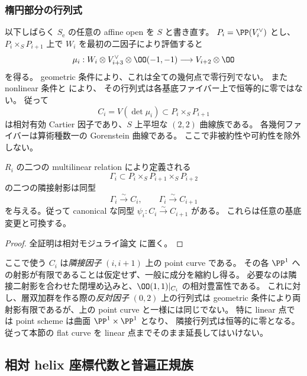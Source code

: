 \subsubsection{楕円部分の行列式}

以下しばらく $S_{\mathrm e}$ の任意の affine open を $S$ と書き直す。
$P_i=\PP(V_i^{\vee})$ とし、$P_i\times_S P_{i+1}$ 上で $W_i$ を最初の二因子により評価すると
\begin{equation}\label{noeth-eq:relation-matrix}
 \mu_i:W_i\otimes V_{i+3}^{\vee}\otimes\OO(-1,-1)
 \longrightarrow V_{i+2}\otimes\OO
\end{equation}
を得る。
geometric 条件により、これは全ての幾何点で零行列でない。
また nonlinear 条件と \cite[\S5.4, 特に Lemma 5.4.10]{VdB2011} により、
その行列式は各基底ファイバー上で恒等的に零ではない。
従って
\[
 C_i=V(\det\mu_i)\subset P_i\times_S P_{i+1}
\]
は相対有効 Cartier 因子であり、$S$ 上平坦な $(2,2)$ 曲線族である。
各幾何ファイバーは算術種数一の Gorenstein 曲線である。
ここで非被約性や可約性を除外しない。

\begin{lemma}\label{noeth-lem:scheme-shift}
$R_i$ の二つの multilinear relation により定義される
\[
 \Gamma_i\subset P_i\times_S P_{i+1}\times_S P_{i+2}
\]
の二つの隣接射影は同型
\[
 \Gamma_i\xrightarrow{\sim}C_i,
 \qquad \Gamma_i\xrightarrow{\sim}C_{i+1}
\]
を与える。従って canonical な同型 $\psi_i:C_i\xrightarrow{\sim}C_{i+1}$ がある。
これらは任意の基底変更と可換する。
\end{lemma}

\begin{proof}
全証明は相対モジュライ論文 \cite[\texttt{relative_cubic_noetherian}]{QuadricModuli2026} に置く。
\end{proof}

\begin{remark}
ここで使う $C_i$ は\emph{隣接因子} $(i,i+1)$ 上の point curve である。
その各 $\PP^1$ への射影が有限であることは仮定せず、一般に成分を縮約し得る。
必要なのは隣接二射影を合わせた閉埋め込みと、$\OO(1,1)|_{C_i}$ の相対豊富性である。
これに対し、層双加群を作る際の\emph{反対因子} $(0,2)$ 上の行列式は
geometric 条件により両射影有限であるが、上の point curve と一様には同じでない。
特に linear 点では point scheme は曲面 $\PP^1\times\PP^1$ となり、
隣接行列式は恒等的に零となる。
従って本節の flat curve を linear 点までそのまま延長してはいけない。
\end{remark}

\subsection{相対 helix 座標代数と普遍正規族}

